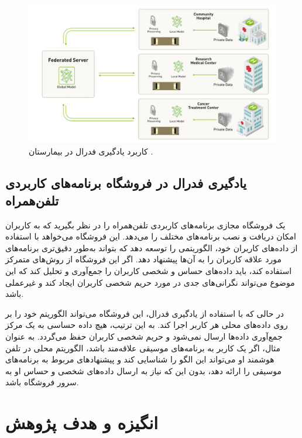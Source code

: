 \begin{figure}[b!]
	\centering
	\includegraphics[scale=1]{images/chap1/hospital.png}%
	\caption{%
		کاربرد یادگیری فدرال در بیمارستان
		\cite{rieke2019what}%
		.
	}
	\label{hospital}
	\centering
\end{figure}



\subsection{
	یادگیری فدرال در فروشگاه برنامه‌های کاربردی%
	تلفن‌همراه
}
یک فروشگاه مجازی برنامه‌های کاربردی تلفن‌همراه را در نظر بگیرید که به کاربران امکان دریافت و نصب برنامه‌های مختلف را می‌دهد. این فروشگاه می‌خواهد با استفاده از داده‌های کاربران خود، الگوریتمی را توسعه دهد که بتواند به‌طور دقیق‌تری برنامه‌های مورد علاقه کاربران را به آن‌ها پیشنهاد دهد. اگر این فروشگاه از روش‌های متمرکز استفاده کند، باید داده‌های حساس و شخصی کاربران را جمع‌آوری و تحلیل کند که این موضوع می‌تواند نگرانی‌های جدی در مورد حریم شخصی کاربران ایجاد کند و غیرعملی باشد.

در حالی که با استفاده از یادگیری فدرال، این فروشگاه می‌تواند الگوریتم خود را بر روی داده‌های محلی هر کاربر اجرا کند. به این ترتیب، هیچ داده حساسی به یک مرکز جمع‌آوری داده‌ها ارسال نمی‌شود و حریم شخصی کاربران حفظ می‌گردد. به عنوان مثال، اگر یک کاربر به برنامه‌های موسیقی علاقه‌مند باشد، الگوریتم محلی در تلفن هوشمند او می‌تواند این الگو را شناسایی کند و پیشنهادهای مربوط به برنامه‌های موسیقی را ارائه دهد، بدون این که نیاز به ارسال داده‌های شخصی و حساس او به سرور فروشگاه باشد.


\section{انگیزه و هدف پژوهش}

